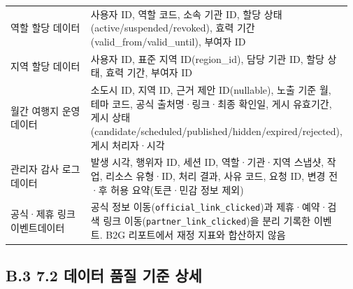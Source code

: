\documentclass[12pt,a4paper]{article}
\newcommand{\DocNeedspace}[1]{\par\ifdim\dimexpr\pagegoal-\pagetotal\relax<#1\newpage\fi}
\newcommand{\AppendixAnchor}[2]{\hypertarget{app:#1#2}{}}
\begin{document}
\begin{small}
\begin{longtable}{@{}>{\RaggedRight\arraybackslash}m{0.300\linewidth}>{\RaggedRight\arraybackslash}m{0.672\linewidth}@{}}
역할 할당 데이터 & 사용자 ID, 역할 코드, 소속 기관 ID, 할당 상태(active/suspended/revoked), 효력 기간(valid\_from/valid\_until), 부여자 ID \\
지역 할당 데이터 & 사용자 ID, 표준 지역 ID(region\_id), 담당 기관 ID, 할당 상태, 효력 기간, 부여자 ID \\
월간 여행지 운영 데이터 & 소도시 ID, 지역 ID, 근거 제안 ID(nullable), 노출 기준 월, 테마 코드, 공식 출처명·링크·최종 확인일, 게시 유효기간, 게시 상태(candidate/scheduled/published/hidden/expired/rejected), 게시 처리자·시각 \\
관리자 감사 로그 데이터 & 발생 시각, 행위자 ID, 세션 ID, 역할·기관·지역 스냅샷, 작업, 리소스 유형·ID, 처리 결과, 사유 코드, 요청 ID, 변경 전·후 허용 요약(토큰·민감 정보 제외) \\
공식·제휴 링크 이벤트\newline 데이터 & 공식 정보 이동(\texttt{official\_\allowbreak{}link\_\allowbreak{}clicked})과 제휴·예약·검색 링크 이동(\texttt{partner\_\allowbreak{}link\_\allowbreak{}clicked})을 분리 기록한 이벤트. B2G 리포트에서 재정 지표와 합산하지 않음 \\
\bottomrule
\end{longtable}
\end{small}


\newpage
\DocNeedspace{18\baselineskip}
\AppendixAnchor{B}{3}
\subsection*{B.3 7.2 데이터 품질 기준 상세}
\end{document}
